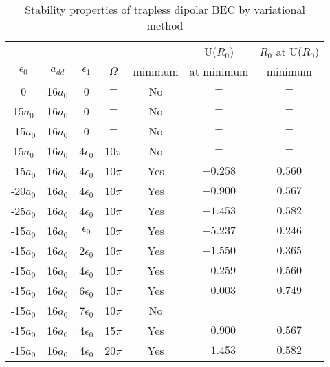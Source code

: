 \documentclass[amsmath,amssymb,article,twocolumn,superscriptaddress,showpacs,10pt]{revtex4-1}
\begin{document}
\begin{table}[!ht]
\caption{Stability properties of trapless dipolar BEC by variational method}
\label{table1}
\begin{center}
\begin{tabular}{|c|c|c|c|c|c|c||}
\hline \hline
& & & & & U($R_0$)   &$R_0$ at  U($R_0$) \\
$\epsilon_0$  &$a_{dd}$ &$\epsilon_1$  &$\Omega$ & minimum & at minimum & minimum  \\
\hline \hline
 0       &16$a_0$ &0             &$-$     &No  &$-$      & $-$ \\ \hline
 15$a_0$ &16$a_0$ &0             &$-$     &No  &$-$      & $-$ \\
-15$a_0$ &16$a_0$ &0             &$-$     &No  &$-$      & $-$ \\ 
 15$a_0$ &16$a_0$ &4$\epsilon_0$ &10$\pi$ &No  &$-$      & $-$ \\
-15$a_0$ &16$a_0$ &4$\epsilon_0$ &10$\pi$ &Yes &$-0.258$ &$0.560$ \\ \hline
-20$a_0$ &16$a_0$ &4$\epsilon_0$ &10$\pi$ &Yes &$-0.900$ &$0.567$ \\
-25$a_0$ &16$a_0$ &4$\epsilon_0$ &10$\pi$ &Yes &$-1.453$ &$0.582$ \\ \hline
-15$a_0$ &16$a_0$ &$\epsilon_0$  &10$\pi$ &Yes &$-5.237$ &$0.246$ \\
-15$a_0$ &16$a_0$ &2$\epsilon_0$ &10$\pi$ &Yes &$-1.550$ &$0.365$ \\
-15$a_0$ &16$a_0$ &4$\epsilon_0$ &10$\pi$ &Yes &$-0.259$ &$0.560$ \\
-15$a_0$ &16$a_0$ &6$\epsilon_0$ &10$\pi$ &Yes &$-0.003$ &$0.749$ \\
-15$a_0$ &16$a_0$ &7$\epsilon_0$ &10$\pi$ &No  &$-$      &$-$     \\ \hline
-15$a_0$ &16$a_0$ &4$\epsilon_0$ &15$\pi$ &Yes &$-0.900$ &$0.567$ \\
-15$a_0$ &16$a_0$ &4$\epsilon_0$ &20$\pi$ &Yes &$-1.453$ &$0.582$ \\
\hline\hline
\end{tabular}
\end{center}
\end{table}
\end{document}
